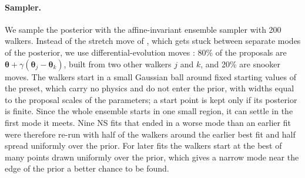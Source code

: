 \paragraph{Sampler.}
We sample the posterior with the affine-invariant ensemble sampler  \citep{ForemanMackey2013} with 200 walkers.
Instead of the stretch move of \citet{Goodman2010}, which gets stuck between separate modes of the posterior, we use differential-evolution moves \citep{terBraak2006, terBraak2008}: 80\% of the proposals are $\boldsymbol\theta + \gamma(\boldsymbol\theta_j - \boldsymbol\theta_k)$, built from two other walkers $j$ and $k$, and 20\% are snooker moves.
The walkers start in a {small} Gaussian ball around {fixed starting values of the preset, which carry no physics and do not enter the prior}, with widths equal to the proposal scales of the parameters; a start point is kept only if its posterior is finite.
{Since the whole ensemble starts in one small region, it can settle in the first mode it meets.
Nine NS fits that ended in a worse mode than an earlier fit were therefore re-run with half of the walkers around the earlier best fit and half spread uniformly over the prior.
For later fits the walkers start at the best of many points drawn uniformly over the prior, which gives a narrow mode near the edge of the prior a better chance to be found.}

